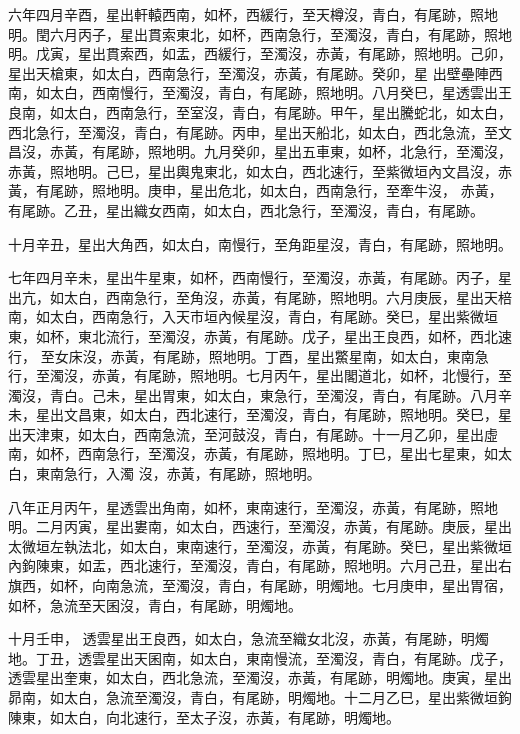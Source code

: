 \begin{pinyinscope}
 六年四月辛酉，星出軒轅西南，如杯，西緩行，至天樽沒，青白，有尾跡，照地明。閏六月丙子，星出貫索東北，如杯，西南急行，至濁沒，青白，有尾跡，照地明。戊寅，星出貫索西，如盂，西緩行，至濁沒，赤黃，有尾跡，照地明。己卯，星出天槍東，如太白，西南急行，至濁沒，赤黃，有尾跡。癸卯，星
 出壁壘陣西南，如太白，西南慢行，至濁沒，青白，有尾跡，照地明。八月癸巳，星透雲出王良南，如太白，西南急行，至室沒，青白，有尾跡。甲午，星出騰蛇北，如太白，西北急行，至濁沒，青白，有尾跡。丙申，星出天船北，如太白，西北急流，至文昌沒，赤黃，有尾跡，照地明。九月癸卯，星出五車東，如杯，北急行，至濁沒，赤黃，照地明。己巳，星出輿鬼東北，如太白，西北速行，至紫微垣內文昌沒，赤黃，有尾跡，照地明。庚申，星出危北，如太白，西南急行，至牽牛沒，
 赤黃，有尾跡。乙丑，星出織女西南，如太白，西北急行，至濁沒，青白，有尾跡。



 十月辛丑，星出大角西，如太白，南慢行，至角距星沒，青白，有尾跡，照地明。



 七年四月辛未，星出牛星東，如杯，西南慢行，至濁沒，赤黃，有尾跡。丙子，星出亢，如太白，西南急行，至角沒，赤黃，有尾跡，照地明。六月庚辰，星出天棓南，如太白，西南急行，入天市垣內候星沒，青白，有尾跡。癸巳，星出紫微垣東，如杯，東北流行，至濁沒，赤黃，有尾跡。戊子，星出王良西，如杯，西北速行，
 至女床沒，赤黃，有尾跡，照地明。丁酉，星出鱉星南，如太白，東南急行，至濁沒，赤黃，有尾跡，照地明。七月丙午，星出閣道北，如杯，北慢行，至濁沒，青白。己未，星出胃東，如太白，東急行，至濁沒，青白，有尾跡。八月辛未，星出文昌東，如太白，西北速行，至濁沒，青白，有尾跡，照地明。癸巳，星出天津東，如太白，西南急流，至河鼓沒，青白，有尾跡。十一月乙卯，星出虛南，如杯，西南急行，至濁沒，赤黃，有尾跡，照地明。丁巳，星出七星東，如太白，東南急行，入濁
 沒，赤黃，有尾跡，照地明。



 八年正月丙午，星透雲出角南，如杯，東南速行，至濁沒，赤黃，有尾跡，照地明。二月丙寅，星出婁南，如太白，西速行，至濁沒，赤黃，有尾跡。庚辰，星出太微垣左執法北，如太白，東南速行，至濁沒，赤黃，有尾跡。癸巳，星出紫微垣內鉤陳東，如盂，西北速行，至濁沒，青白，有尾跡，照地明。六月己丑，星出右旗西，如杯，向南急流，至濁沒，青白，有尾跡，明燭地。七月庚申，星出胃宿，如杯，急流至天囷沒，青白，有尾跡，明燭地。



 十月壬申，
 透雲星出王良西，如太白，急流至織女北沒，赤黃，有尾跡，明燭地。丁丑，透雲星出天囷南，如太白，東南慢流，至濁沒，青白，有尾跡。戊子，透雲星出奎東，如太白，西北急流，至濁沒，赤黃，有尾跡，明燭地。庚寅，星出昴南，如太白，急流至濁沒，青白，有尾跡，明燭地。十二月乙巳，星出紫微垣鉤陳東，如太白，向北速行，至太子沒，赤黃，有尾跡，明燭地。




\end{pinyinscope}

